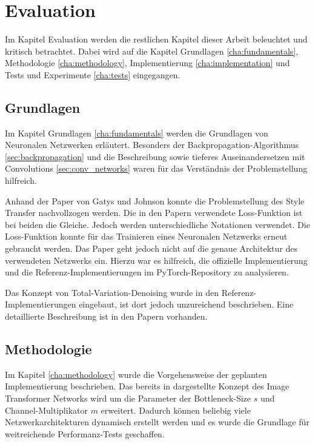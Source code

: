 \chapter{Evaluation}

Im Kapitel Evaluation werden die restlichen Kapitel dieser Arbeit beleuchtet und kritisch betrachtet. Dabei wird auf die Kapitel Grundlagen \ref{cha:fundamentals}, Methodologie \ref{cha:methodology}, Implementierung \ref{cha:implementation} und Tests und Experimente \ref{cha:tests} eingegangen.

\section{Grundlagen}

Im Kapitel Grundlagen \ref{cha:fundamentals} werden die Grundlagen von Neuronalen Netzwerken erläutert. Besonders der Backpropagation-Algorithmus \ref{sec:backpropagation} und die Beschreibung sowie tieferes Auseinandersetzen mit Convolutions \ref{sec:conv_networks} waren für das Verständnis der Problemstellung hilfreich.

Anhand der Paper von Gatys \cite{DBLP:journals/corr/GatysEB15a} und Johnson \cite{DBLP:journals/corr/JohnsonAL16} konnte die Problemstellung des Style Transfer nachvollzogen werden. Die in den Papern verwendete Loss-Funktion ist bei beiden die Gleiche. Jedoch werden unterschiedliche Notationen verwendet. Die Loss-Funktion konnte für das Trainieren eines Neuronalen Netzwerks erneut gebraucht werden. Das Paper \cite{DBLP:journals/corr/JohnsonAL16} geht jedoch nicht auf die genaue Architektur des verwendeten Netzwerks ein. Hierzu war es hilfreich, die offizielle Implementierung \cite{Johnson2016} und die Referenz-Implementierungen im PyTorch-Repository \cite{OnlineToturialNeuralStylePyTorch} zu analysieren.

Das Konzept von Total-Variation-Denoising wurde in den Referenz-Implementierungen eingebaut, ist dort jedoch unzureichend beschrieben. Eine detaillierte Beschreibung ist in den Papern \cite{RUDIN1992259, DBLP:journals/corr/EstrelaMS16} vorhanden.

\section{Methodologie}

Im Kapitel \ref{cha:methodology} wurde die Vorgehensweise der geplanten Implementierung beschrieben. Das bereits in \cite{DBLP:journals/corr/JohnsonAL16} dargestellte Konzept des Image Transformer Networks wird um die Parameter der Bottleneck-Size $ s $ und Channel-Multiplikator $ m $ erweitert. Dadurch können beliebig viele Netzwerkarchitekturen dynamisch erstellt werden und es wurde die Grundlage für weitreichende Performanz-Tests geschaffen.

